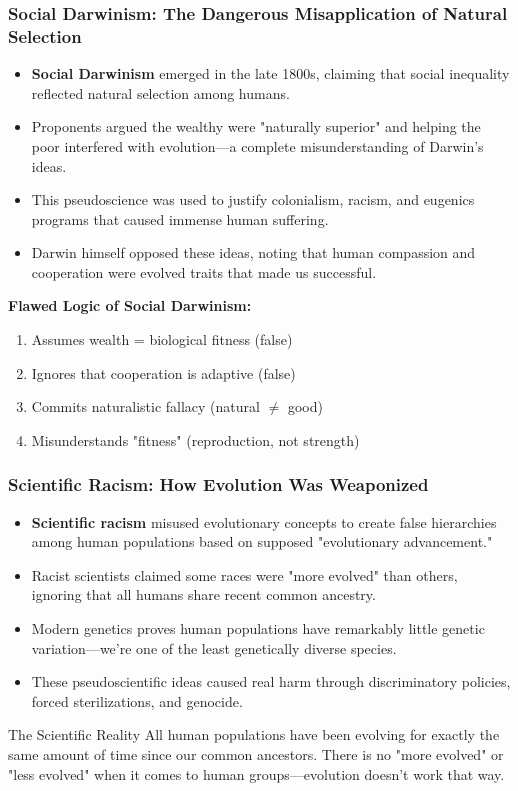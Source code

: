 \documentclass{beamer}
\begin{document}
	\begin{frame}
		\frametitle{Social Darwinism: The Dangerous Misapplication of Natural Selection}
		\begin{itemize}
			\item \textbf{Social Darwinism} emerged in the late 1800s, claiming that social inequality reflected natural selection among humans.
			\item Proponents argued the wealthy were "naturally superior" and helping the poor interfered with evolution—a complete misunderstanding of Darwin's ideas.
			\item This pseudoscience was used to justify colonialism, racism, and eugenics programs that caused immense human suffering.
			\item Darwin himself opposed these ideas, noting that human compassion and cooperation were evolved traits that made us successful.
		\end{itemize}
		\begin{example}
			\scriptsize
			\textbf{Flawed Logic of Social Darwinism:}
			\begin{enumerate}
				\item Assumes wealth = biological fitness (false)
				\item Ignores that cooperation is adaptive (false)
				\item Commits naturalistic fallacy (natural $\neq$ good)
				\item Misunderstands "fitness" (reproduction, not strength)
			\end{enumerate}
		\end{example}
	\end{frame}
	
	\begin{frame}
		\frametitle{Scientific Racism: How Evolution Was Weaponized}
		\begin{itemize}
			\item \textbf{Scientific racism} misused evolutionary concepts to create false hierarchies among human populations based on supposed "evolutionary advancement."
			\item Racist scientists claimed some races were "more evolved" than others, ignoring that all humans share recent common ancestry.
			\item Modern genetics proves human populations have remarkably little genetic variation—we're one of the least genetically diverse species.
			\item These pseudoscientific ideas caused real harm through discriminatory policies, forced sterilizations, and genocide.
		\end{itemize}
		\begin{alertblock}{The Scientific Reality}
			All human populations have been evolving for exactly the same amount of time since our common ancestors. There is no "more evolved" or "less evolved" when it comes to human groups—evolution doesn't work that way.
		\end{alertblock}
	\end{frame}
	
\end{document}
